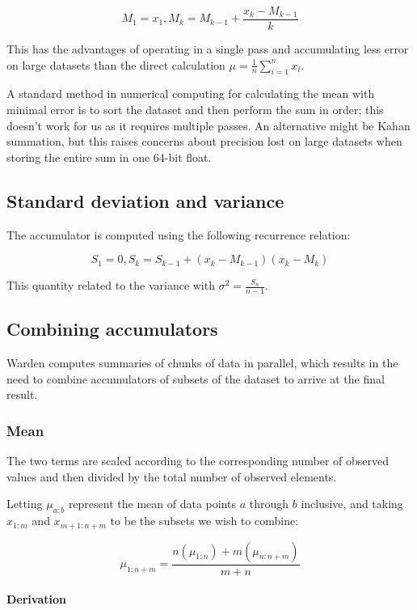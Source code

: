 \documentclass[a4paper]{article}
\begin{document}
\[M_1 = x_1, M_k = M_{k-1} + \frac{x_k - M_{k-1}}{k}\]

This has the advantages of operating in a single pass and accumulating
less error on large datasets than the direct calculation
\(\mu = \frac{1}{n} \sum\limits_{i=1}^n x_i\).

A standard method in numerical computing for calculating the mean with
minimal error is to sort the dataset and then perform the sum in order;
this doesn't work for us as it requires multiple passes. An alternative
might be Kahan summation\cite{Kahan1965}, but this raises concerns about
precision lost on large datasets when storing the entire sum in one
64-bit float.

\subsection{Standard deviation and
variance}\label{standard-deviation-and-variance}

The accumulator is computed using the following recurrence relation\cite[pp.~232]{Knuth1997}:

\[S_1 = 0, S_k = S_{k-1} + (x_k - M_{k-1})(x_k - M_k)\]

This quantity related to the variance with
\(\sigma^2 = \frac{S_n}{n-1}\).

\subsection{Combining accumulators}\label{combining-accumulators}

Warden computes summaries of chunks of data in parallel, which results
in the need to combine accumulators of subsets of the dataset to arrive
at the final result.

\subsubsection{Mean}\label{mean}

The two terms are scaled according to the corresponding number of
observed values and then divided by the total number of observed
elements.

Letting \(\mu_{a:b}\) represent the mean of data points \(a\) through
\(b\) inclusive, and taking \(x_{1:m}\) and \(x_{m+1:n+m}\) to be the
subsets we wish to combine:

\[\mu_{1:n+m} = \frac{n(\mu_{1:n}) + m(\mu_{n:n+m})}{m + n}\]

\paragraph{Derivation}\label{derivation}
\end{document}
